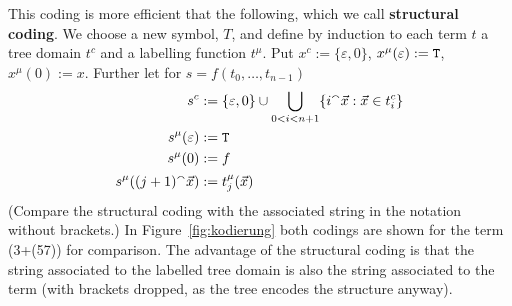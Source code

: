 This coding is more efficient that the following, which we call
\textbf{structural coding}.
We choose a new symbol, $T$, and define
by induction to each term $t$ a tree domain $t^c$ and a
labelling function $t^{\mu}$. Put $x^c := \{\varepsilon, 0\}$,
$x^{\mu}(\varepsilon) := \mbox{\tt T}$, $x^{\mu}(0) := x$. Further
let for $s = f(t_0, \dotsc, t_{n-1})$
\begin{equation}
\begin{split}
s^c & := \{\varepsilon, 0\} \cup
    \bigcup_{0 < i < n+1} \{i {^{\smallfrown}} \vec{x} : \vec{x} \in t_i^c\}
\\
s^{\mu}(\varepsilon) & := \mbox{\tt T} \\
s^{\mu}(0) & := f \\
s^{\mu}((j+1) {^{\smallfrown}} \vec{x}) & := t_j^{\mu}(\vec{x})
\end{split}
\end{equation}
(Compare the structural coding with the associated string in the
notation without brackets.) In Figure~\ref{fig:kodierung} both
codings are shown for the term {\mtt (3+(57))} for
comparison. The advantage of the structural coding is that the
string associated to the labelled tree domain is also the string
associated to the term (with brackets dropped, as the tree encodes
the structure anyway).

